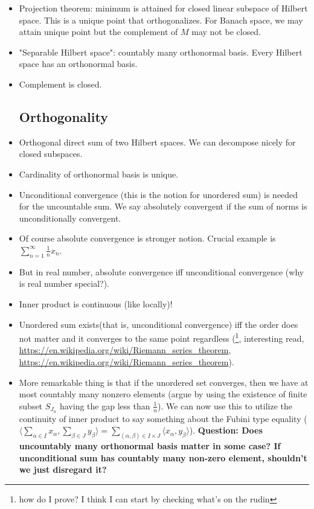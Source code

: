 \documentclass{article}
\theoremstyle{remark}
\begin{document}
\begin{itemize}
\item Projection theorem: minimum is attained for closed linear subspace of Hilbert space. This is a unique point that orthogonalizes. For Banach space, we may attain unique point but the complement of $M$ may not be closed.
\item "Separable Hilbert space": countably many orthonormal basis. Every Hilbert space has an orthonormal basis.
\item Complement is closed.

\subsection*{Orthogonality}
\item Orthogonal direct sum of two Hilbert spaces. We can decompose nicely for closed subspaces.
\item Cardinality of orthonormal basis is unique.
\item Unconditional convergence (this is the notion for unordered sum) is needed for the uncountable sum. We say absolutely convergent if the sum of norms is unconditionally convergent.
\item Of course absolute convergence is stronger notion. Crucial example is $\sum^{\infty}_{n=1}\frac 1n x_n$.
\item But in real number, absolute convergence iff unconditional convergence (why is real number special?).
\item Inner product is continuous (like locally)!
\item Unordered sum exists(that is, unconditional convergence) iff the order does not matter and it converges to the same point regardless (\footnote{how do I prove? I think I can start by checking what's on the rudin}, interesting read, \url{https://en.wikipedia.org/wiki/Riemann_series_theorem}, \url{https://en.wikipedia.org/wiki/Riemann_series_theorem}).
\item More remarkable thing is that if the unordered set converges, then we have at most countably many nonzero elements (argue by using the existence of finite subset $S_{J_n}$ having the gap less than $\frac 1n$). We can now use this to utilize the continuity of inner product to say something about the Fubini type equality ($\langle\sum_{\alpha\in I}x_\alpha,\sum_{\beta\in J}y_\beta\rangle=\sum_{(\alpha,\beta)\in I\times J}\langle x_\alpha,y_\beta\rangle$). \textbf{Question: Does uncountably many orthonormal basis matter in some case? If unconditional sum has countably many non-zero element, shouldn't we just disregard it?}


\end{itemize}
\end{document}
